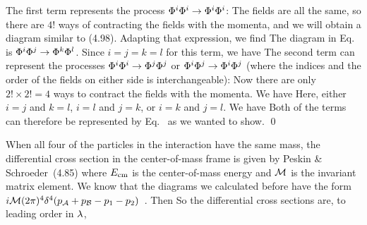 {	The first term represents the process $\Phi^i \Phi^i \to \Phi^i \Phi^i$:
	The fields are all the same, so there are $4!$ ways of contracting the fields with the momenta, and we will obtain a diagram similar to (4.98).  Adapting that expression, we find
	The diagram in Eq.~ is $\Phi^i \Phi^j \to \Phi^k \Phi^l$.  Since $i = j = k = l$ for this term, we have
	The second term can represent the processes $\Phi^i \Phi^i \to \Phi^j \Phi^j$ or $\Phi^i \Phi^j \to \Phi^i \Phi^j$ (where the indices and the order of the fields on either side is interchangeable):
	Now there are only $2! \times 2! = 4$ ways to contract the fields with the momenta.  We have
	Here, either $i = j$ and $k = l$, $i = l$ and $j = k$, or $i = k$ and $j = l$.  We have
	Both of the terms can therefore be represented by Eq.~ as we wanted to show. \qed
	
	When all four of the particles in the interaction have the same mass, the differential cross section in the center-of-mass frame is given by Peskin \& Schroeder~(4.85)
	where $E_{\text{cm}}$ is the center-of-mass energy and $\mathcal{M}$ is the invariant matrix element.  We know that the diagrams we calculated before have the form $i \mathcal{M} (2\pi)^4 \delta^4(p_{\mathcal{A}} + p_{\mathcal{B}} - p_1 - p_2)$~\cite[p.~112]{Peskin}.  Then
	So the differential cross sections are, to leading order in $\lambda$,
	\vfix
}



